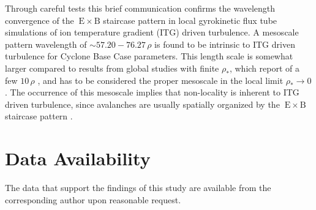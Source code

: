 \documentclass[aip, amsmath, amssymb, reprint, twocolumn]{revtex4-1}
\newcommand{\exb}{\mathrm{\:E}\times\mathrm{B}}
\newcommand{\rhoth}{\rho}
\begin{document}


Through careful tests this brief communication confirms the wavelength convergence of the $\exb$ staircase pattern in local gyrokinetic flux tube simulations of ion temperature gradient (ITG) driven turbulence.
A mesoscale pattern wavelength of $\sim 57.20 - 76.27\,\rhoth$ is found to be intrinsic to ITG driven turbulence for Cyclone Base Case parameters.
This length scale is somewhat larger compared to results from global studies with finite $\rho_\ast$, which report of a few $10\,\rhoth$ \cite{pradalier2010}, and has to be considered the proper mesoscale in the local limit $\rho_\ast \rightarrow 0$.  
The occurrence of this mesoscale implies that non-locality is inherent to ITG driven turbulence, since avalanches are usually spatially organized by the $\exb$ staircase pattern \cite{mcmillan2009, pradalier2010, rath2016, peeters2016}. 


\section*{Data Availability}
The data that support the findings of this study are available from the corresponding author upon reasonable request. 


\wordcountmessage


\end{document}
